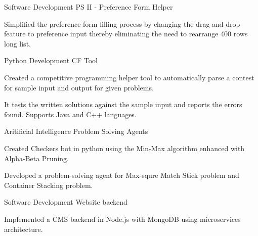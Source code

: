 

\begin{cventries}

  \cventry
    {Software Development} %
    {PS II - Preference Form Helper} %
    {} %
    {} %
    {
      \begin{cvitems}
        \item{Simplified the preference form filling process by changing the
         drag-and-drop feature to preference input thereby eliminating the need
         to rearrange 400 rows long list.}
      \end{cvitems}
    }

  \cventry
    {Python Development} %
    {CF Tool} %
    {} %
    {} %
    {
      \begin{cvitems}
        \item{Created a competitive programming helper tool to automatically parse
         a contest for sample input and output for given problems.}
        \item{It tests the written solutions against the sample input and reports
         the errors found. Supports Java and C++ languages.}
      \end{cvitems}
    }

  \cventry
    {Aritificial Intelligence} %
    {Problem Solving Agents} %
    {} %
    {} %
    {
      \begin{cvitems}
        \item{Created Checkers bot in python using the Min-Max algorithm enhanced with
         Alpha-Beta Pruning.}
        \item{Developed a problem-solving agent for Max-squre Match Stick problem
         and Container Stacking problem.}
      \end{cvitems}
    }

  \cventry
    {Software Development} %
    {Website backend} %
    {} %
    {} %
    {
      \begin{cvitems}
        \item{Implemented a CMS backend in Node.js with MongoDB using microservices
         architecture.}
      \end{cvitems}
    }

\end{cventries}
